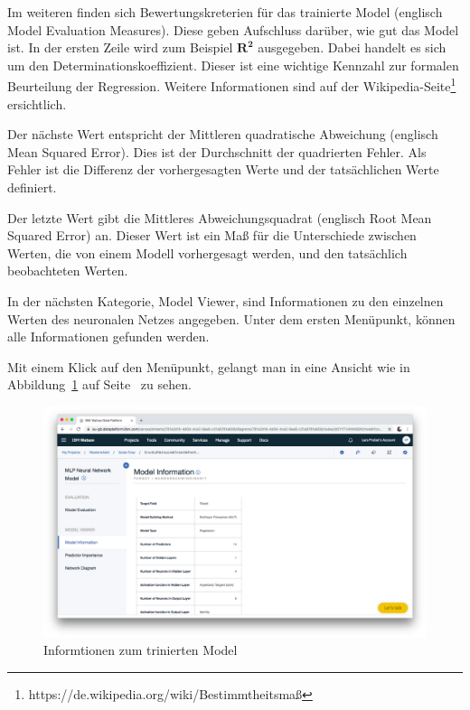 Im weiteren finden sich Bewertungskreterien für das trainierte Model (englisch Model Evaluation Measures). Diese geben
Aufschluss darüber, wie gut das Model ist. In der ersten Zeile wird zum Beispiel $\mathbf{R^2}$ ausgegeben.  Dabei
handelt es sich um den Determinationskoeffizient. Dieser ist eine wichtige Kennzahl zur formalen Beurteilung der
Regression. Weitere Informationen sind auf der Wikipedia-Seite\footnote{https://de.wikipedia.org/wiki/Bestimmtheitsmaß}
ersichtlich.

Der nächste Wert entspricht der Mittleren quadratische Abweichung (englisch Mean Squared Error). Dies ist der Durchschnitt
der quadrierten Fehler. Als Fehler ist die Differenz der vorhergesagten Werte und der tatsächlichen Werte definiert.

Der letzte Wert gibt die Mittleres Abweichungsquadrat (englisch Root Mean Squared Error) an. Dieser Wert ist ein Maß
für die Unterschiede zwischen Werten, die von einem Modell vorhergesagt werden, und den tatsächlich beobachteten Werten.

In der nächsten Kategorie, Model Viewer, sind Informationen zu den einzelnen Werten des neuronalen Netzes angegeben.
Unter dem ersten Menüpunkt, können alle Informationen gefunden werden.

Mit einem Klick auf den Menüpunkt, gelangt man in eine Ansicht wie in Abbildung~\ref{fig:umsetzung_model_information}
auf Seite~\pageref{fig:umsetzung_model_information} zu sehen.

\begin{figure}[h]
    \centering
    \includegraphics[width=\textwidth]{images/kapitel_3/model_information.png}
    \caption{Informtionen zum trinierten Model}
    \label{fig:umsetzung_model_information}
\end{figure}

